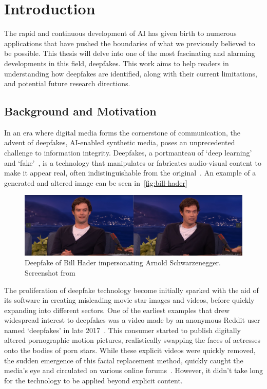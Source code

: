 
\chapter{Introduction}\label{chapter:introduction}
The rapid and continuous development of \ac{AI} has given birth to numerous
applications that have pushed the boundaries of what we previously believed to be possible.
This thesis will delve into one of the most fascinating and alarming developments in this
field, deepfakes. This work aims to help readers in understanding how deepfakes are
identified, along with their current limitations, and potential future research directions.



\section{Background and Motivation}\label{chapter:backgroundAndMotivation}
In an era where digital media forms the cornerstone of communication, the advent of deepfakes,
\ac{AI}-enabled synthetic media, poses an unprecedented challenge to information integrity.
Deepfakes, a portmanteau of `deep learning' and `fake'~\cite{Gardiner2019FacialRS,10.1145/3425780,Nguyen_2022},
is a technology that manipulates or fabricates audio-visual content to make it appear
real, often indistinguishable from the original~\cite{10.1145/3543873.3587581}. An example of a generated and altered image can be seen in~\autoref{fig:bill-hader}
\begin{figure}[hb]
	\centering
	\includegraphics[scale=0.289]{figures/bill-arnold}
	\caption{Deepfake of Bill Hader impersonating Arnold Schwarzenegger. Screenshot from~\cite{bill-hader}}\label{fig:bill-hader}
\end{figure}

The proliferation of deepfake technology become initially sparked with the aid of
its software in creating misleading movie star images and videos, before quickly
expanding into different sectors. One of the earliest examples that drew widespread
interest to deepfakes was a video made by an anonymous Reddit user named `deepfakes'
in late 2017~\cite{10.1145/3491102.3517446, 10.1145/3425780}.
This consumer started to publish digitally altered pornographic motion pictures,
realistically swapping the faces of actresses onto the bodies of porn stars.
While these explicit videos were quickly removed, the sudden emergence of this facial
replacement method, quickly caught the media's eye and circulated on various online forums~\cite{albahar2019deepfakes}.
However, it didn't take long for the technology to be applied beyond explicit content.

